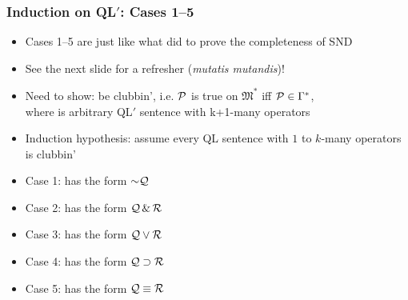 \begin{frame}
\frametitle{Induction on QL$'$: Cases 1--5}

\begin{itemize}

\item Cases 1--5 are just like what did to prove the completeness of SND

\item See the next slide for a refresher (\textit{mutatis mutandis})!

\item Need to show:  be clubbin', i.e. $\mathcal{P}$ is true on $\mathfrak{M}^{\ast}$ iff $\mathcal{P} \in \Gamma^{\ast}$, \\ where  is arbitrary QL$'$ sentence with k+1-many operators

\item \alert{Induction hypothesis}: assume every QL sentence with $1$ to $k$-many operators is clubbin' 

\item Case 1:  has the form $\enot \metav{Q}$

\item Case 2:  has the form $\mathcal{Q} \,\&\, \mathcal{R}$


\item Case 3:   has the form $\mathcal{Q} \vee \mathcal{R}$

\item Case 4:  has the form $\mathcal{Q} \supset \mathcal{R}$ 

\item Case 5:  has the form $\mathcal{Q} \equiv \mathcal{R}$ 



\end{itemize}
\end{frame}

